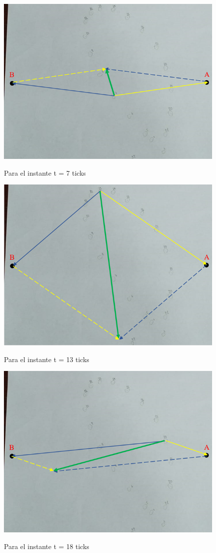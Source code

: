 \documentclass[../main.tex]{subfiles}
\begin{document}
\begin{figure}[H]
    \centering
    \includegraphics[width=0.8\linewidth]{images/calc4.png}
    \label{ref:calc4}
    \caption{Para el instante t = 7 ticks}
\end{figure}

\begin{figure}[H]
    \centering
    \includegraphics[width=0.8\linewidth]{images/calc5.png}
    \label{ref:calc5}
    \caption{Para el instante t = 13 ticks}
\end{figure}
\begin{figure}[H]
    \centering
    \includegraphics[width=0.8\linewidth]{images/calc6.png}
    \label{ref:calc6}
    \caption{Para el instante t = 18 ticks}
\end{figure}
\end{document}
